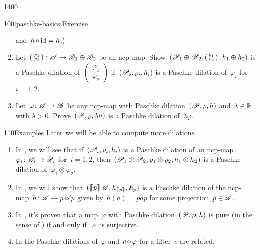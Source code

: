 \begin{parsec}{1400}
\begin{point}{100}[paschke-basics]{Exercise}
\begin{enumerate}
and~$h \mathop{\circ} \mathrm{id} = h$.)
\item
    Let~$ \left(\begin{smallmatrix} \varphi_1 \\ \varphi_2
    \end{smallmatrix}\right) \colon \mathscr{A} \to \mathscr{B}_1 \oplus \mathscr{B}_2$
    be an ncp-map.
Show~$(\mathscr{P}_1 \oplus \mathscr{P}_2,
        \left(\begin{smallmatrix} \varrho_1 \\ \varrho_2 \end{smallmatrix}\right),
        h_1 \oplus h_2)$
        is a Paschke dilation of~$\left(\begin{smallmatrix} \varphi_1 \\ \varphi_2 
        \end{smallmatrix}\right)$
    if~$(\mathscr{P}_i, \varrho_i, h_i)$
    is a Paschke dilation of~$\varphi_i$ for~$i=1,2$.
\item
Let~$\varphi\colon \mathscr{A} \to \mathscr{B}$
    be any ncp-map with Paschke dilation~$(\mathscr{P}, \varrho, h)$
    and~$\lambda \in \mathbb{R}$ with $\lambda > 0$.
Prove~$(\mathscr{P}, \varrho, \lambda h)$
    is a Paschke dilation of~$\lambda \varphi$.
\end{enumerate}
\end{point}
\begin{point}{110}{Examples}%
Later we will be able to compute more dilations.
\begin{enumerate}
\item
In , we will see
    that if~$(\mathscr{P}_i, \varrho_i, h_i)$
    is a Paschke dilation of an ncp-map~$\varphi_i \colon \mathscr{A}_i \to \mathscr{B}_i$
    for~$i=1,2$,
    then~$(\mathscr{P}_1 \otimes \mathscr{P}_2, \varrho_1\otimes \varrho_2, h_1\otimes h_2)$
    is a Paschke dilation of~$\varphi_1 \otimes \varphi_2$.
\item
In , we will
    show that~$(\cceil{p}\scrA, h_{\cceil{p}}, h_p)$
    is a Paschke dilation of the
    ncp-map~$h\colon \mathscr{A} \to p \mathscr{A} p$
    given by~$h(a) = pap$ for some projection~$p\in \mathscr{A}$.
\item
In , it's proven
    that a map~$\varphi$
    with Paschke dilation~$(\mathscr{P}, \varrho, h)$
    is pure (in the sense of )
    if and only if~$\varrho$ is surjective.
\item
In 
    the Paschke dilations of~$\varphi$
    and~$c \mathop{\circ} \varphi$ for a filter~$c$ are related.
\end{enumerate}
\end{point}
\end{parsec}

